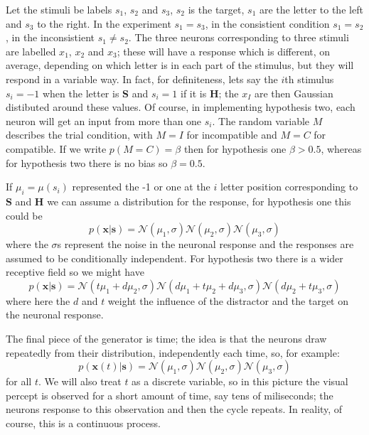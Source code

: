 \documentclass[12pt]{article}
\begin{document}
Let the stimuli be labels $s_1$, $s_2$ and $s_3$, $s_2$ is the target,
$s_1$ are the letter to the left and $s_3$ to the right. In the
experiment $s_1=s_3$, in the consistient condition $s_1=s_2$, in the
inconsistient $s_1\not=s_2$. The three neurons corresponding to three
stimuli are labelled $x_1$, $x_2$ and $x_3$; these will have a
response which is different, on average, depending on which letter is
in each part of the stimulus, but they will respond in a variable
way. In fact, for definiteness, lets say the $i$th stimulus $s_i=-1$
when the letter is \textbf{S} and $s_i=1$ if it is \textbf{H}; the
$x_I$ are then Gaussian distibuted around these values. Of course, in
implementing hypothesis two, each neuron will get an input from more
than one $s_i$. The random variable $M$ describes the trial condition,
with $M=I$ for incompatible and $M=C$ for compatible. If we write
$p(M=C)=\beta$ then for hypothesis one $\beta>0.5$, whereas for
hypothesis two there is no bias so $\beta=0.5$.

If $\mu_i=\mu(s_i)$ represented the -1 or one at the $i$ letter
position corresponding to \textbf{S} and \textbf{H} we can assume a
distribution for the response, for hypothesis one this could be
\begin{equation}
p(\textbf{x}|\textbf{s})=\mathcal{N}(\mu_1,\sigma)\mathcal{N}(\mu_2,\sigma)\mathcal{N}(\mu_3,\sigma)
\end{equation}
where the $\sigma$s represent the noise in the neuronal response and the responses are assumed to be conditionally independent. For hypothesis two there is a wider receptive field so we might have
\begin{equation}
p(\textbf{x}|\textbf{s})=\mathcal{N}(t\mu_1+d\mu_2,\sigma)\mathcal{N}(d\mu_1+t\mu_2+d\mu_3,\sigma)\mathcal{N}(d\mu_2+t\mu_3,\sigma)
\end{equation}
where here the $d$ and $t$ weight the influence of the distractor and
the target on the neuronal response.

The final piece of the generator is time; the idea is that the neurons
draw repeatedly from their distribution, independently each time, so, for example:
\begin{equation}
p(\textbf{x}(t)|\textbf{s})=\mathcal{N}(\mu_1,\sigma)\mathcal{N}(\mu_2,\sigma)\mathcal{N}(\mu_3,\sigma)
\end{equation}
for all $t$. We will also treat $t$ as a discrete variable, so in this
picture the visual percept is observed for a short amount of time, say
tens of miliseconds; the neurons response to this observation and then
the cycle repeats. In reality, of course, this is a continuous
process.
\end{document}
